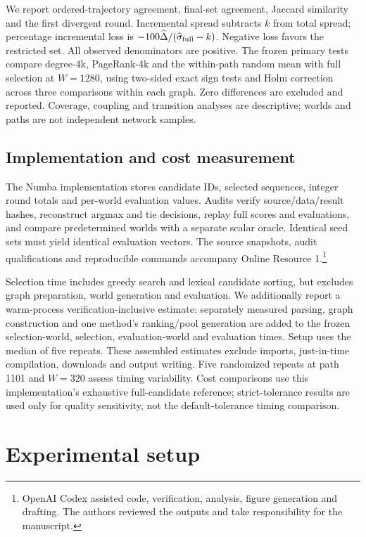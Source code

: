 \documentclass[smallextended]{svjour3}
\begin{document}
We report ordered-trajectory agreement, final-set agreement, Jaccard similarity and the first divergent round. Incremental spread subtracts $k$ from total spread; percentage incremental loss is $-100\widehat\Delta/(\widehat\sigma_{\rm full}-k)$. Negative loss favors the restricted set. All observed denominators are positive. The frozen primary tests compare degree-4k, PageRank-4k and the within-path random mean with full selection at $W=1280$, using two-sided exact sign tests and Holm correction across three comparisons within each graph. Zero differences are excluded and reported. Coverage, coupling and transition analyses are descriptive; worlds and paths are not independent network samples.

\subsection{Implementation and cost measurement}
The Numba implementation stores candidate IDs, selected sequences, integer round totals and per-world evaluation values. Audits verify source/data/result hashes, reconstruct argmax and tie decisions, replay full scores and evaluations, and compare predetermined worlds with a separate scalar oracle. Identical seed sets must yield identical evaluation vectors. The source snapshots, audit qualifications and reproducible commands accompany Online Resource 1.\footnote{OpenAI Codex assisted code, verification, analysis, figure generation and drafting. The authors reviewed the outputs and take responsibility for the manuscript.}

Selection time includes greedy search and lexical candidate sorting, but excludes graph preparation, world generation and evaluation. We additionally report a warm-process verification-inclusive estimate: separately measured parsing, graph construction and one method's ranking/pool generation are added to the frozen selection-world, selection, evaluation-world and evaluation times. Setup uses the median of five repeats. These assembled estimates exclude imports, just-in-time compilation, downloads and output writing. Five randomized repeats at path 1101 and $W=320$ assess timing variability. Cost comparisons use this implementation's exhaustive full-candidate reference; strict-tolerance results are used only for quality sensitivity, not the default-tolerance timing comparison.

\section{Experimental setup}
\end{document}
